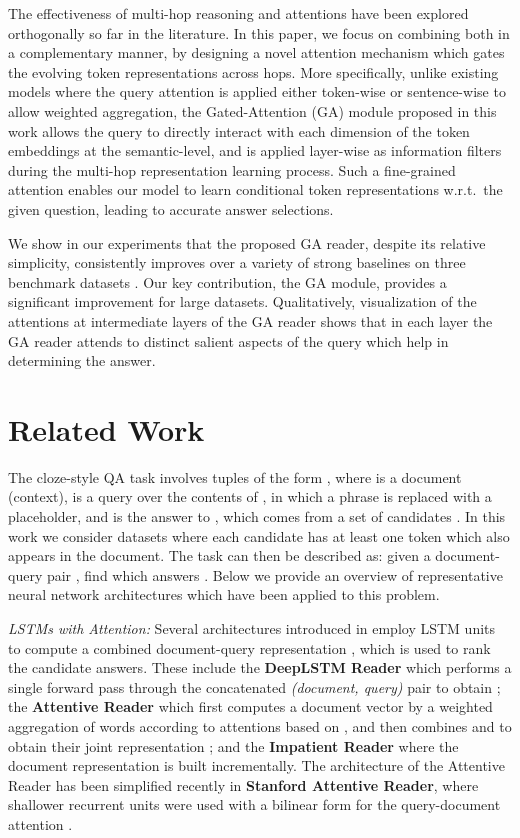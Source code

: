 \documentclass[11pt,a4paper]{article}
\begin{document}
The effectiveness of multi-hop reasoning and attentions have been explored orthogonally so far
in the literature.
In this paper,
we focus on combining both in a complementary manner,
by designing a novel attention mechanism which gates the evolving token representations across hops.
More specifically,
unlike existing models where the query attention
is applied either token-wise \citep{hermann2015teaching, kadlec2016text, chen2016thorough, hill2015goldilocks} or
sentence-wise \citep{weston2014memory, sukhbaatar2015end} to allow weighted aggregation,
the Gated-Attention (GA) module proposed in this work allows the query to directly interact with each dimension
of the token embeddings at the semantic-level,
and is applied layer-wise as information filters during the multi-hop representation learning process.
Such a fine-grained attention enables our model to learn conditional token representations w.r.t.\ the given question,
leading to accurate answer selections. 

We show in our experiments that the proposed GA reader,
despite its relative simplicity,
consistently improves over a variety of strong baselines on three benchmark datasets
. 
Our key contribution, the GA module, provides a significant improvement for large datasets. Qualitatively, visualization of the attentions at intermediate layers of the GA reader shows that in each layer the GA reader attends to distinct salient aspects of the query which help in determining the answer. 

\section{Related Work}
\label{sec:related}
The cloze-style QA task involves tuples of the form , where  is a document (context),  is a query over the contents of , in which a phrase is replaced with a placeholder, and  is the answer to , which comes from a set of candidates . In this work we consider datasets where each candidate  has at least one token which also appears in the document. The task can then be described as: given a document-query pair , find  which answers . Below we provide an overview of representative neural network architectures which have been applied to this problem.

\textit{LSTMs with Attention:} Several architectures introduced in \citet{hermann2015teaching}
employ LSTM units to compute a combined document-query representation ,
which is used to rank the candidate answers.
These include the \textbf{DeepLSTM Reader} which performs a single forward pass through the concatenated \textit{(document, query)} pair to obtain ;
the \textbf{Attentive Reader} which first computes a document vector  by a weighted aggregation of words according to attentions based on , and then combines  and  to obtain their joint representation ;
and the \textbf{Impatient Reader} where the document representation is built incrementally.
The architecture of the Attentive Reader has been simplified recently in \textbf{Stanford Attentive Reader},
where shallower recurrent units were used with a bilinear form for the query-document attention \citep{chen2016thorough}.
\end{document}
